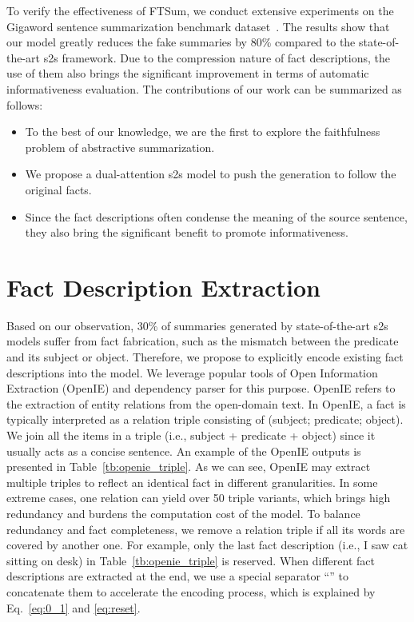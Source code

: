 \documentclass[letterpaper]{article} \usepackage{aaai18}  \usepackage{times}  \usepackage{helvet}  \usepackage{courier}  \usepackage{url}  \usepackage{graphicx}  \usepackage{amsfonts}
\begin{document}
	To verify the effectiveness of FTSum, we conduct extensive experiments on the Gigaword sentence summarization benchmark dataset~\cite{rush-chopra-weston:2015:EMNLP}.
	The results show that our model greatly reduces the fake summaries by 80\% compared to the state-of-the-art s2s framework.
	Due to the compression nature of fact descriptions, the use of them also brings the significant improvement in terms of automatic informativeness evaluation. 
The contributions of our work can be summarized as follows:
	\begin{itemize}
		\item To the best of our knowledge, we are the first to explore the faithfulness problem of abstractive summarization.
		\item We propose a dual-attention s2s model to push the generation to follow the original facts.
		\item Since the fact descriptions often condense the meaning of
		the source sentence, they also bring the significant benefit to promote informativeness.
	\end{itemize}
	
	
	\section{Fact Description Extraction}
	Based on our observation, 30\% of summaries generated by state-of-the-art s2s models suffer from fact fabrication, such as the mismatch between the predicate and its subject or object.
	Therefore, we propose to explicitly encode existing fact descriptions into the model.
	We leverage popular tools of Open Information Extraction (OpenIE) and dependency parser for this purpose.
	OpenIE refers to the extraction of entity relations from the open-domain text. 
	In OpenIE, a fact is typically interpreted as a relation triple consisting of (subject; predicate; object).
	We join all the items in a triple (i.e., subject + predicate + object) since it usually acts as a concise sentence.
	An example of the OpenIE outputs is presented in Table~\ref{tb:openie_triple}.
	As we can see,  OpenIE may extract multiple triples to reflect an identical fact in different granularities.
	In some extreme cases, one relation can yield over 50 triple variants, which brings high redundancy and burdens the computation cost of the model.
	To balance redundancy and fact completeness, we remove a relation triple if all its words are covered by another one.
	For example, only the last fact description (i.e., I saw cat sitting on desk) in Table~\ref{tb:openie_triple} is reserved.
	When different fact descriptions are extracted at the end, we use a special separator ``'' to concatenate them to accelerate the encoding process, which is explained by Eq.~\ref{eq:0_1} and \ref{eq:reset}.
	
\end{document}
